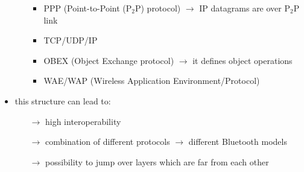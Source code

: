\begin{itemize}
\begin{itemize}
\begin{itemize}
            \item PPP (Point-to-Point (P$_2$P) protocol) $\rightarrow$ IP datagrams are over P$_2$P link
            \item TCP/UDP/IP
            \item OBEX (Object Exchange protocol) $\rightarrow$ it defines object operations
            \item WAE/WAP (Wireless Application Environment/Protocol)
        \end{itemize} 
    \end{itemize}
    \item this structure can lead to:
    \begin{itemize}
        \item[$\rightarrow$] high interoperability
        \item[$\rightarrow$] combination of different protocols $\rightarrow$ different Bluetooth models
        \item[$\rightarrow$] possibility to jump over layers which are far from each other
    \end{itemize}
\end{itemize}

